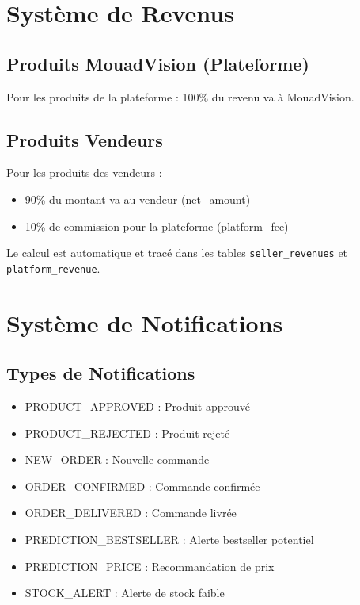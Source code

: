 \documentclass[12pt,a4paper]{report}
\begin{document}
\section{Système de Revenus}

\subsection{Produits MouadVision (Plateforme)}

Pour les produits de la plateforme : 100\% du revenu va à MouadVision.

\subsection{Produits Vendeurs}

Pour les produits des vendeurs :
\begin{itemize}[noitemsep]
    \item 90\% du montant va au vendeur (net\_amount)
    \item 10\% de commission pour la plateforme (platform\_fee)
\end{itemize}

Le calcul est automatique et tracé dans les tables \texttt{seller\_revenues} et \texttt{platform\_revenue}.

\section{Système de Notifications}

\subsection{Types de Notifications}

\begin{itemize}[noitemsep]
    \item PRODUCT\_APPROVED : Produit approuvé
    \item PRODUCT\_REJECTED : Produit rejeté
    \item NEW\_ORDER : Nouvelle commande
    \item ORDER\_CONFIRMED : Commande confirmée
    \item ORDER\_DELIVERED : Commande livrée
    \item PREDICTION\_BESTSELLER : Alerte bestseller potentiel
    \item PREDICTION\_PRICE : Recommandation de prix
    \item STOCK\_ALERT : Alerte de stock faible
\end{itemize}
\end{document}
